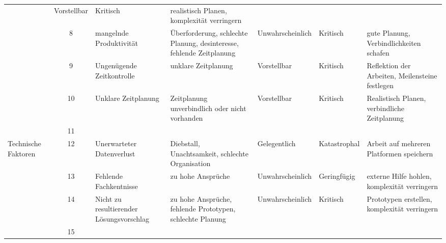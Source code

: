 \begin{landscape}
\begin{table}[h!]
\begin{tabular}{p{} c p{} p{} p{} p{} p{}}
            & Vorstellbar 
            & Kritisch 
            & realistisch Planen, komplexität verringern \\
	    \rowcolor{yellow}
            & 8 
            & mangelnde Produktivität 
            & Überforderung, schlechte Planung, desinteresse, fehlende Zeitplanung 
            & Unwahrscheinlich 
            & Kritisch 
            & gute Planung, Verbindlichkeiten schafen \\
        \rowcolor{yellow}
	        & 9 
            & Ungenügende Zeitkontrolle 
            & unklare Zeitplanung 
            & Vorstellbar 
            & Kritisch 
            & Reflektion der Arbeiten, Meilensteine festlegen \\
        \rowcolor{yellow}
	        & 10 
            & Unklare Zeitplanung 
            & Zeitplanung unverbindlich oder nicht vorhanden 
            & Vorstellbar 
            & Kritisch 
            & Realistisch Planen, verbindliche Zeitplanung \\
        \rowcolor{yellow}
	        & 11 
            & 
            & 
            & 
            & 
            & \\
        \rowcolor{red} Technische Faktoren 
            & 12 
            & Unerwarteter Datenverlust 
            & Diebstall, Unachtsamkeit, schlechte Organisation 
            & Gelegentlich 
            & Katastrophal 
            & Arbeit auf mehreren Platformen speichern \\
        \rowcolor{green} 
            & 13 
            & Fehlende Fachkentnisse 
            & zu hohe Ansprüche 
            & Unwahrscheinlich 
            & Geringfügig 
            & externe Hilfe hohlen, komplexität verringern \\
        \rowcolor{yellow}
	        & 14 
            & Nicht zu resultierender Lösungsvorschlag 
            & zu hohe Ansprüche, fehlende Prototypen, schlechte Planung 
            & Unwahrscheinlich 
            & Kritisch 
            & Prototypen erstellen, komplexität verringern \\
        \rowcolor{yellow} 
            & 15 
            & 
            & 
            & 
            & 
            & \\
	\end{tabular}
\end{table}
\end{landscape}
